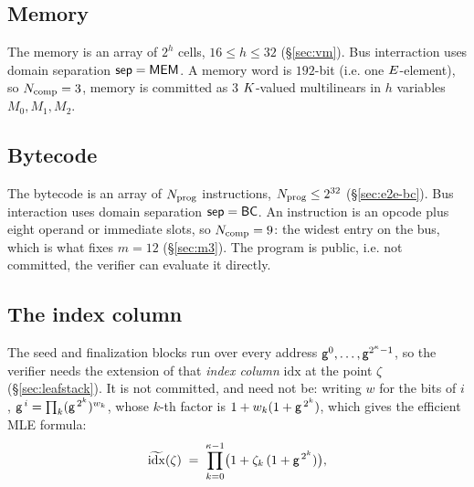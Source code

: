 \subsection{Memory}\label{sec:memchan}

The memory is an array of $2^{h}$ cells, $16\le h\le32$ (\S\ref{sec:vm}). Bus interraction uses domain separation $\mathsf{sep}=\mathsf{MEM}$. A memory word is $192$-bit (i.e. one $E$-element), so $N_{\mathrm{comp}}=3$, memory is committed as 3 $K$-valued multilinears in $h$ variables $M_0,M_1,M_2$.

\subsection{Bytecode}\label{sec:bytecode}

The bytecode is an array of $N_{\mathrm{prog}}$ instructions, $N_{\mathrm{prog}}\le2^{32}$ (\S\ref{sec:e2e-bc}). Bus interaction uses domain separation $\mathsf{sep}=\mathsf{BC}$. An instruction is an opcode plus eight operand or immediate slots, so $N_{\mathrm{comp}}=9$: the widest entry on the bus, which is what fixes $m=12$ (\S\ref{sec:m3}). The program is public, i.e. not committed, the verifier can evaluate it directly.

\subsection{The index column}\label{sec:idxcol}

The seed and finalization blocks run over every address $\mathsf{g}^{0},\dots,\mathsf{g}^{2^{\kappa}-1}$, so the verifier needs the extension of that \emph{index column} $\mathrm{idx}$ at the point $\zeta$ (\S\ref{sec:leafstack}). It is not committed, and need not be: writing $w$ for the bits of $i$, $\mathsf{g}^{\,i}=\prod_k(\mathsf{g}^{\,2^{k}})^{w_k}$, whose $k$-th factor is $1+w_k(1+\mathsf{g}^{\,2^{k}})$, which gives the efficient MLE formula:
\[
  \widetilde{\mathrm{idx}}(\zeta)\;=\;\prod_{k=0}^{\kappa-1}\bigl(1+\zeta_k\,(1+\mathsf{g}^{\,2^{k}})\bigr),
\]
